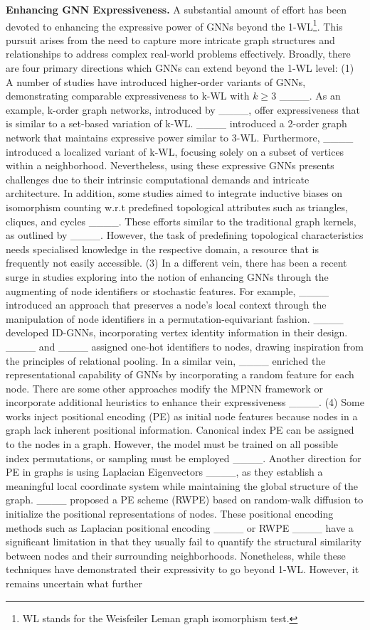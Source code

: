 \vspace{0.1cm}
\noindent
\textbf{Enhancing GNN Expressiveness. } A substantial amount of effort has been devoted to enhancing the expressive power of GNNs beyond the 1-WL\footnote{WL stands for the Weisfeiler Leman graph isomorphism test.}. This pursuit arises from the need to capture more intricate graph structures and relationships to address complex real-world problems effectively. Broadly, there are four primary directions which GNNs can extend beyond the 1-WL level: (1) A number of studies have introduced higher-order variants of GNNs, demonstrating comparable expressiveness to k-WL with $k\geq3$ ____. As an example, k-order graph networks, introduced by ____, offer expressiveness that is similar to a set-based variation of k-WL. ____ introduced a 2-order graph network that maintains expressive power similar to 3-WL. Furthermore, ____ introduced a localized variant of k-WL, focusing solely on a subset of vertices within a neighborhood. Nevertheless, using these expressive GNNs presents challenges due to their intrinsic computational demands and intricate architecture. In addition, some studies aimed to integrate inductive biases on isomorphism counting w.r.t predefined topological attributes such as triangles, cliques, and cycles ____. These efforts similar to the traditional graph kernels, as outlined by ____. However, the task of predefining topological characteristics needs specialised knowledge in the respective domain, a resource that is frequently not easily accessible. (3) In a different vein, there has been a recent surge in studies exploring into the notion of enhancing GNNs through the augmenting of node identifiers or stochastic features. For example, ____ introduced an approach that preserves a node's local context through the manipulation of node identifiers in a permutation-equivariant fashion. ____ developed ID-GNNs, incorporating vertex identity information in their design. ____ and ____ assigned one-hot identifiers to nodes, drawing inspiration from the principles of relational pooling. In a similar vein, ____ enriched the representational capability of GNNs by incorporating a random feature for each node. There are some other approaches modify the MPNN framework or incorporate additional heuristics to enhance their expressiveness ____. (4) Some works inject positional encoding (PE) as initial node features because nodes in a graph lack inherent positional information. Canonical index PE can be assigned to the nodes in a graph. However, the model must be trained on all possible index permutations, or sampling must be employed ____. Another direction for PE in graphs is using Laplacian Eigenvectors ____, as they establish a meaningful local coordinate system while maintaining the global structure of the graph. ____ proposed a PE scheme (RWPE) based on random-walk diffusion to initialize the positional representations of nodes. These positional encoding methods such as Laplacian positional encoding ____ or RWPE ____ have a significant limitation in that they usually fail to quantify the structural similarity between nodes and their surrounding neighborhoods. Nonetheless, while these techniques have demonstrated their expressivity to go beyond 1-WL. However, it remains uncertain what further 